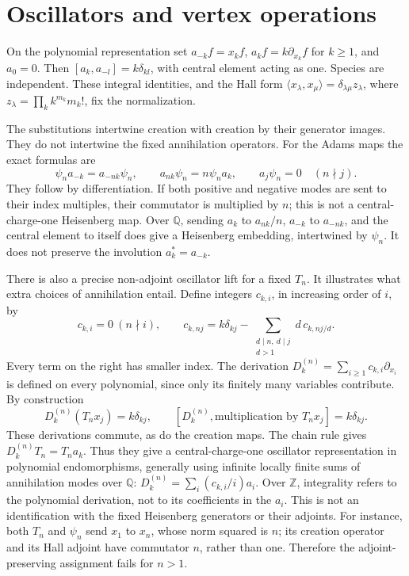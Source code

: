 \section{Oscillators and vertex operations}
\label{v4-arith:ado:vertex}
\label{v4-arith:gb:is-there-lambda-VA}

On the polynomial representation set
\(a_{-k}f=x_kf\), \(a_kf=k\partial_{x_k}f\) for \(k\ge1\), and
\(a_0=0\). Then \([a_k,a_{-l}]=k\delta_{kl}\), with central element
acting as one. Species are independent. These integral identities,
and the Hall form
\(\langle x_\lambda,x_\mu\rangle=\delta_{\lambda\mu}z_\lambda\),
where \(z_\lambda=\prod_k k^{m_k}m_k!\), fix the normalization.

The substitutions intertwine creation with creation by their generator
images. They do not intertwine the fixed annihilation operators.
For the Adams maps the exact formulas are
\[
 \psi_n a_{-k}=a_{-nk}\psi_n,\qquad
 a_{nk}\psi_n=n\psi_n a_k,\qquad
 a_j\psi_n=0\quad(n\nmid j).
\]
They follow by differentiation. If both positive and negative modes are
sent to their index multiples, their commutator is multiplied by \(n\);
this is not a central-charge-one Heisenberg map. Over \(\mathbb Q\),
sending \(a_k\) to \(a_{nk}/n\), \(a_{-k}\) to \(a_{-nk}\), and the
central element to itself does give a Heisenberg embedding, intertwined
by \(\psi_n\). It does not preserve the involution
\(a_k^*=a_{-k}\).

There is also a precise non-adjoint oscillator lift for a fixed \(T_n\).
It illustrates what extra choices of annihilation entail. Define integers
\(c_{k,i}\), in increasing order of \(i\), by
\[
 c_{k,i}=0\ (n\nmid i),\qquad
 c_{k,nj}=k\delta_{kj}
          -\sum_{\substack{d\mid n,\ d\mid j\\d>1}}d\,c_{k,nj/d}.
\]
Every term on the right has smaller index. The derivation
\(D_k^{(n)}=\sum_{i\ge1}c_{k,i}\partial_{x_i}\) is defined on every
polynomial, since only its finitely many variables contribute. By
construction
\[
 D_k^{(n)}(T_nx_j)=k\delta_{kj},\qquad
 [D_k^{(n)},\text{multiplication by }T_nx_j]=k\delta_{kj}.
\]
These derivations commute, as do the creation maps. The chain rule gives
\(D_k^{(n)}T_n=T_na_k\). Thus they give a central-charge-one oscillator
representation in polynomial endomorphisms, generally using infinite
locally finite sums of annihilation modes over \(\mathbb Q\):
\(D_k^{(n)}=\sum_i(c_{k,i}/i)a_i\). Over \(\mathbb Z\), integrality
refers to the polynomial derivation, not to its coefficients in the
\(a_i\). This is not an identification with the fixed Heisenberg
generators or their adjoints. For instance,
both \(T_n\) and \(\psi_n\) send \(x_1\) to \(x_n\), whose norm squared
is \(n\); its creation operator and its Hall adjoint have commutator
\(n\), rather than one. Therefore the adjoint-preserving assignment fails
for \(n>1\).

